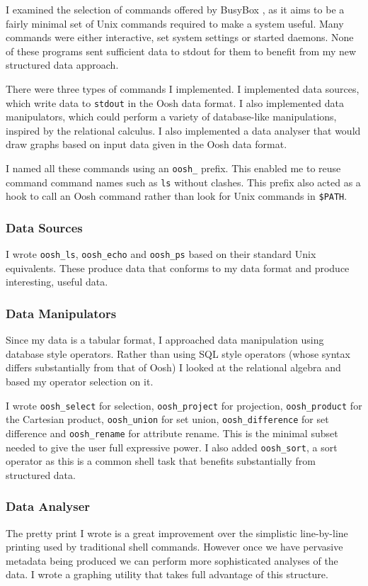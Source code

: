 \documentclass[12pt,twoside,notitlepage]{report}
\begin{document}
I examined the selection of commands offered by BusyBox
\cite{busybox}, as it aims to be a fairly minimal set of Unix commands
required to make a system useful. Many commands were either
interactive, set system settings or started daemons. None of these
programs sent sufficient data to stdout for them to benefit from my
new structured data approach.

There were three types of commands I implemented. I implemented data
sources, which write data to {\tt stdout} in the Oosh data format. I
also implemented data manipulators, which could perform a variety of
database-like manipulations, inspired by the relational calculus. I
also implemented a data analyser that would draw graphs based on input
data given in the Oosh data format.

I named all these commands using an {\tt oosh\_} prefix. This enabled me
to reuse command command names such as {\tt ls} without clashes. This
prefix also acted as a hook to call an Oosh command rather than look
for Unix commands in {\tt \$PATH}.


\subsubsection{Data Sources}
I wrote {\tt oosh\_ls}, {\tt oosh\_echo} and {\tt oosh\_ps} based on their
standard Unix equivalents. These produce data that conforms to my data
format and produce interesting, useful data.

\subsubsection{Data Manipulators}
Since my data is a tabular format, I approached data manipulation
using database style operators. Rather than using SQL style operators
(whose syntax differs substantially from that of Oosh) I looked at the
relational algebra and based my operator selection on it.

I wrote {\tt oosh\_select} for selection, {\tt oosh\_project} for
projection, {\tt oosh\_product} for the Cartesian product,
{\tt oosh\_union} for set union, {\tt oosh\_difference} for set difference
and {\tt oosh\_rename} for attribute rename. This is the minimal subset
needed to give the user full expressive power. I also added
{\tt oosh\_sort}, a sort operator as this is a common shell task that
benefits substantially from structured data.

\subsubsection{Data Analyser}
The pretty print I wrote is a great improvement over the simplistic
line-by-line printing used by traditional shell commands. However once
we have pervasive metadata being produced we can perform more
sophisticated analyses of the data. I wrote a graphing utility that
takes full advantage of this structure.
\end{document}
